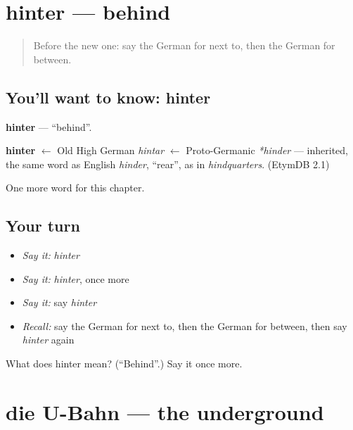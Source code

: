 \section[hinter]{hinter — behind}

\label{lesson:GE-C110-hinter}



\begin{quote}
Before the new one: say the German for next to, then the German for between.
\end{quote}

\subsection*{You'll want to know: hinter}
\textbf{hinter} — \textquotedblleft{}behind\textquotedblright{}.

\begin{cousinweb}
\textbf{hinter} $\leftarrow$ Old High German \emph{hintar} $\leftarrow$ Proto-Germanic \emph{*hinder} — inherited, the same word as English \emph{hinder}, \textquotedblleft{}rear\textquotedblright{}, as in \emph{hindquarters}. (EtymDB 2.1)
\end{cousinweb}

\begin{grammarlens}[title={What you've built}]
One more word for this chapter.
\end{grammarlens}

\subsection*{Your turn}
\begin{itemize}
\raggedright
  \item \emph{Say it:} \emph{hinter}
  \item \emph{Say it:} \emph{hinter}, once more
  \item \emph{Say it:} say \emph{hinter}
  \item \emph{Recall:} say the German for next to, then the German for between, then say \emph{hinter} again
\end{itemize}

\begin{tcolorbox}[breakable,colback=teal!4,colframe=teal!35!black,title={Before you move on}]
What does hinter mean? (\textquotedblleft{}Behind\textquotedblright{}.) Say it once more.
\end{tcolorbox}
\section[die U-Bahn]{die U-Bahn — the underground}

